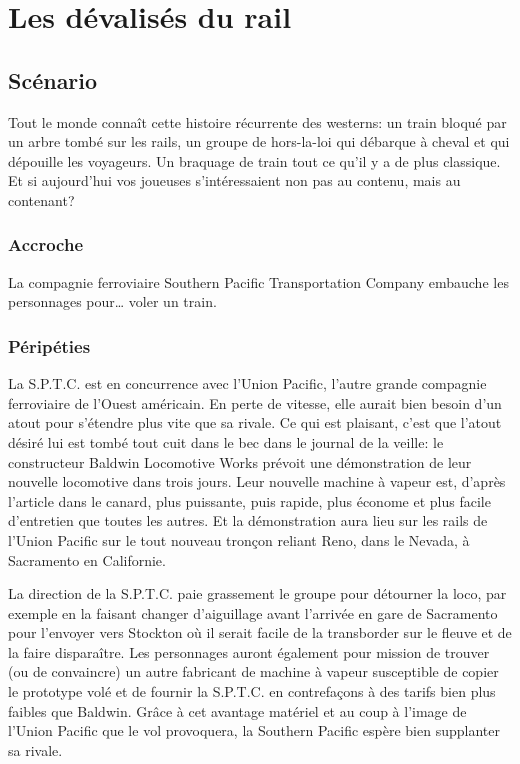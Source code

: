 \chapter{Les dévalisés du rail}

\section{Scénario}

Tout le monde connaît cette histoire récurrente des westerns: un train bloqué par un arbre tombé sur les rails, un groupe de hors-la-loi qui débarque à cheval et qui dépouille les voyageurs.
Un braquage de train tout ce qu'il y a de plus classique.
Et si aujourd'hui vos joueuses s'intéressaient non pas au contenu, mais au contenant?

\subsection{Accroche}

La compagnie ferroviaire Southern Pacific Transportation Company embauche les personnages pour\dots{} voler un train.

\subsection{Péripéties}

La S.P.T.C. est en concurrence avec l'Union Pacific, l'autre grande compagnie ferroviaire de l'Ouest américain.
En perte de vitesse, elle aurait bien besoin d'un atout pour s'étendre plus vite que sa rivale.
Ce qui est plaisant, c'est que l'atout désiré lui est tombé tout cuit dans le bec dans le journal de la veille: le constructeur Baldwin Locomotive Works prévoit une démonstration de leur nouvelle locomotive dans trois jours.
Leur nouvelle machine à vapeur est, d'après l'article dans le canard, plus puissante, puis rapide, plus économe et plus facile d'entretien que toutes les autres. Et la démonstration aura lieu sur les rails de l'Union Pacific sur le tout nouveau tronçon reliant Reno, dans le Nevada, à Sacramento en Californie.

La direction de la S.P.T.C. paie grassement le groupe pour détourner la loco, par exemple en la faisant changer d'aiguillage avant l'arrivée en gare de Sacramento pour l'envoyer vers Stockton où il serait facile de la transborder sur le fleuve et de la faire disparaître.
Les personnages auront également pour mission de trouver (ou de convaincre) un autre fabricant de machine à vapeur susceptible de copier le prototype volé et de fournir la S.P.T.C. en contrefaçons à des tarifs bien plus faibles que Baldwin.
Grâce à cet avantage matériel et au coup à l'image de l'Union Pacific que le vol provoquera, la Southern Pacific espère bien supplanter sa rivale.

